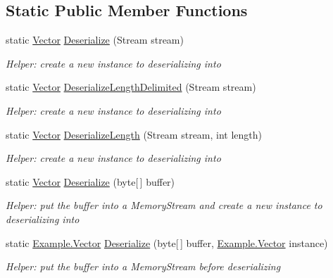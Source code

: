 \subsection*{Static Public Member Functions}
\begin{DoxyCompactItemize}
\item 
static \hyperlink{class_example_1_1_vector}{Vector} \hyperlink{class_example_1_1_vector_a818efcb4e8291291770ef378c1f25e9e}{Deserialize} (Stream stream)
\begin{DoxyCompactList}\small\item\em Helper\+: create a new instance to deserializing into\end{DoxyCompactList}\item 
static \hyperlink{class_example_1_1_vector}{Vector} \hyperlink{class_example_1_1_vector_ac0d43068ece1c2630c4251dff5e8ada0}{Deserialize\+Length\+Delimited} (Stream stream)
\begin{DoxyCompactList}\small\item\em Helper\+: create a new instance to deserializing into\end{DoxyCompactList}\item 
static \hyperlink{class_example_1_1_vector}{Vector} \hyperlink{class_example_1_1_vector_abe963061d88c30a7242d5bb92828d18f}{Deserialize\+Length} (Stream stream, int length)
\begin{DoxyCompactList}\small\item\em Helper\+: create a new instance to deserializing into\end{DoxyCompactList}\item 
static \hyperlink{class_example_1_1_vector}{Vector} \hyperlink{class_example_1_1_vector_a9f29e4e1efdfb2e0841623ff2311cce5}{Deserialize} (byte\mbox{[}$\,$\mbox{]} buffer)
\begin{DoxyCompactList}\small\item\em Helper\+: put the buffer into a Memory\+Stream and create a new instance to deserializing into\end{DoxyCompactList}\item 
static \hyperlink{class_example_1_1_vector}{Example.\+Vector} \hyperlink{class_example_1_1_vector_a2bedbd5f974dd3d18fc86300b673f55d}{Deserialize} (byte\mbox{[}$\,$\mbox{]} buffer, \hyperlink{class_example_1_1_vector}{Example.\+Vector} instance)
\begin{DoxyCompactList}\small\item\em Helper\+: put the buffer into a Memory\+Stream before deserializing\end{DoxyCompactList}\item 

\end{DoxyCompactItemize}

